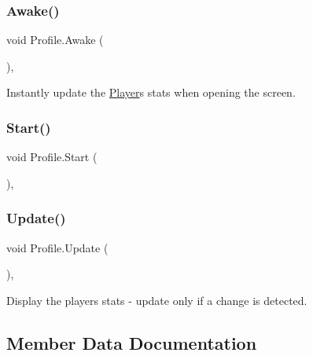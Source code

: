 \subsubsection{\texorpdfstring{Awake()}{Awake()}}
{\footnotesize\ttfamily void Profile.\+Awake (\begin{DoxyParamCaption}{ }\end{DoxyParamCaption})\hspace{0.3cm}{\ttfamily [inline]}, {\ttfamily [private]}}



Instantly update the \mbox{\hyperlink{class_player}{Player}}\textquotesingle{}s stats when opening the screen. 

\mbox{\label{class_profile_a647e62f8ea4ea155450b61f840196144}} 
\subsubsection{\texorpdfstring{Start()}{Start()}}
{\footnotesize\ttfamily void Profile.\+Start (\begin{DoxyParamCaption}{ }\end{DoxyParamCaption})\hspace{0.3cm}{\ttfamily [inline]}, {\ttfamily [private]}}

\mbox{\label{class_profile_a2764f91d58e74837f15fcea7b04635b7}} 
\subsubsection{\texorpdfstring{Update()}{Update()}}
{\footnotesize\ttfamily void Profile.\+Update (\begin{DoxyParamCaption}{ }\end{DoxyParamCaption})\hspace{0.3cm}{\ttfamily [inline]}, {\ttfamily [private]}}



Display the player\textquotesingle{}s stats -\/ update only if a change is detected. 



\subsection{Member Data Documentation}
\mbox{\label{class_profile_a26998b6035cb44a2fd1640899306fbd5}} 
